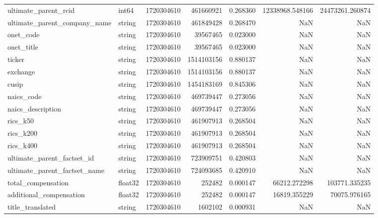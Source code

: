 \documentclass{article}
\begin{document}
\begin{longtable}{llrrrrr}
ultimate_parent_rcid & int64 & 1720304610 & 461660921 & 0.268360 & 12338968.548166 & 24473261.260874 \\
ultimate_parent_company_name & string & 1720304610 & 461849428 & 0.268470 & NaN & NaN \\
onet_code & string & 1720304610 & 39567465 & 0.023000 & NaN & NaN \\
onet_title & string & 1720304610 & 39567465 & 0.023000 & NaN & NaN \\
ticker & string & 1720304610 & 1514103156 & 0.880137 & NaN & NaN \\
exchange & string & 1720304610 & 1514103156 & 0.880137 & NaN & NaN \\
cusip & string & 1720304610 & 1454183169 & 0.845306 & NaN & NaN \\
naics_code & string & 1720304610 & 469739447 & 0.273056 & NaN & NaN \\
naics_description & string & 1720304610 & 469739447 & 0.273056 & NaN & NaN \\
rics_k50 & string & 1720304610 & 461907913 & 0.268504 & NaN & NaN \\
rics_k200 & string & 1720304610 & 461907913 & 0.268504 & NaN & NaN \\
rics_k400 & string & 1720304610 & 461907913 & 0.268504 & NaN & NaN \\
ultimate_parent_factset_id & string & 1720304610 & 723909751 & 0.420803 & NaN & NaN \\
ultimate_parent_factset_name & string & 1720304610 & 724093685 & 0.420910 & NaN & NaN \\
total_compensation & float32 & 1720304610 & 252482 & 0.000147 & 66212.272298 & 103771.335235 \\
additional_compensation & float32 & 1720304610 & 252482 & 0.000147 & 16819.355229 & 70075.976165 \\
title_translated & string & 1720304610 & 1602102 & 0.000931 & NaN & NaN \\
\end{longtable}
\end{document}
